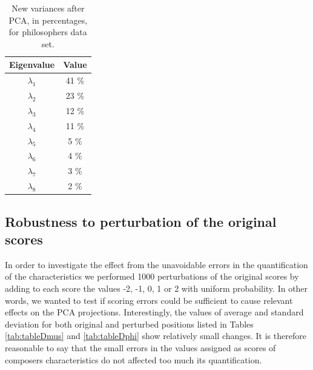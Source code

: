\documentclass[
 aip,
 jmp,
 amsmath,amssymb,
 reprint,
]{revtex4-1}
\begin{document}
\begin{table}%
\caption{\label{tab:tableCphi}New variances after PCA, in percentages, for philosophers data set.}

\begin{tabular}{|c||c|}
\hline
Eigenvalue & Value \\ \hline
$\lambda_1$ &  41 \% \\
$\lambda_2$ &  23 \% \\
$\lambda_3$ &  12 \% \\
$\lambda_4$ &  11 \% \\
$\lambda_5$ &   5 \% \\
$\lambda_6$ &   4 \% \\
$\lambda_7$ &   3 \%    \\
$\lambda_8$ &   2 \%    \\
\hline

\end{tabular}
\end{table}

\subsection{Robustness to perturbation of the original scores}

In order to investigate the effect from the unavoidable errors in the
quantification of the characteristics we performed 1000 perturbations of
the original scores by adding to each score the values -2, -1, 0, 1 or 2 with
uniform probability. In other words, we wanted to test if scoring
errors could be sufficient to cause relevant effects
on the PCA projections. Interestingly, the values of average and
standard deviation for both original and perturbed positions listed in Tables
\ref{tab:tableDmus} and \ref{tab:tableDphi} show relatively small changes. It is therefore reasonable to say that the small errors in the values assigned as scores of composers
characteristics do not affected too much its quantification.
\end{document}
